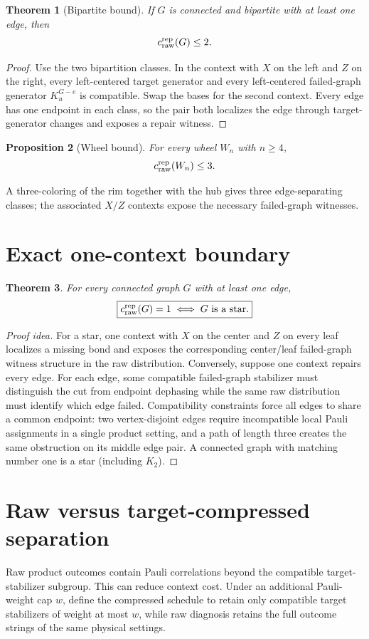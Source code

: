 \documentclass[11pt]{article}
\newtheorem{theorem}{Theorem}[section]
\newtheorem{proposition}[theorem]{Proposition}
\newcommand{\crep}{c_{\rm raw}^{\rm rep}}
\begin{document}
\begin{theorem}[Bipartite bound]
If $G$ is connected and bipartite with at least one edge, then
\[
\crep(G)\le2.
\]
\end{theorem}
\begin{proof}
Use the two bipartition classes. In the context with $X$ on the left and $Z$ on the right, every left-centered target generator and every left-centered failed-graph generator $K_u^{G-e}$ is compatible. Swap the bases for the second context. Every edge has one endpoint in each class, so the pair both localizes the edge through target-generator changes and exposes a repair witness.
\end{proof}

\begin{proposition}[Wheel bound]
For every wheel $W_n$ with $n\ge4$,
\[
\crep(W_n)\le3.
\]
\end{proposition}
A three-coloring of the rim together with the hub gives three edge-separating classes; the associated $X/Z$ contexts expose the necessary failed-graph witnesses.

\section{Exact one-context boundary}
\begin{theorem}
For every connected graph $G$ with at least one edge,
\[
\boxed{\crep(G)=1\iff G\text{ is a star}.}
\]
\end{theorem}
\begin{proof}[Proof idea]
For a star, one context with $X$ on the center and $Z$ on every leaf localizes a missing bond and exposes the corresponding center/leaf failed-graph witness structure in the raw distribution. Conversely, suppose one context repairs every edge. For each edge, some compatible failed-graph stabilizer must distinguish the cut from endpoint dephasing while the same raw distribution must identify which edge failed. Compatibility constraints force all edges to share a common endpoint: two vertex-disjoint edges require incompatible local Pauli assignments in a single product setting, and a path of length three creates the same obstruction on its middle edge pair. A connected graph with matching number one is a star (including $K_2$).
\end{proof}

\section{Raw versus target-compressed separation}
Raw product outcomes contain Pauli correlations beyond the compatible target-stabilizer subgroup. This can reduce context cost. Under an additional Pauli-weight cap $w$, define the compressed schedule to retain only compatible target stabilizers of weight at most $w$, while raw diagnosis retains the full outcome strings of the same physical settings.
\end{document}
